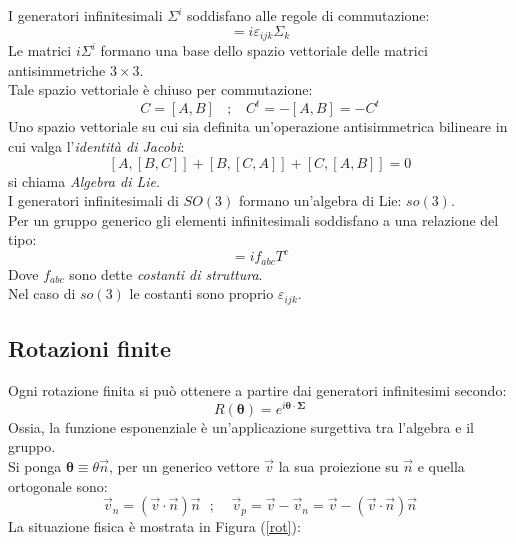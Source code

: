 \documentclass[twoside]{article}
\begin{document}
I generatori infinitesimali $\Sigma^i$ soddisfano alle regole di commutazione:
\begin{equation}
    [\Sigma_i,\Sigma_j]=i\varepsilon_{ijk}\Sigma_k
\end{equation}
Le matrici $i\Sigma^i$ formano una base dello spazio vettoriale delle matrici antisimmetriche $3\times 3$.
\\
Tale spazio vettoriale è chiuso per commutazione:
\begin{equation}
    C=[A,B] \ \ \ \ ; \ \ \ \ C^t=-[A,B]=-C^t
\end{equation}
Uno spazio vettoriale su cui sia definita un'operazione antisimmetrica bilineare in cui valga l'\textit{identità di Jacobi}:
\begin{equation} \label{Jacobi}
    [A,[B,C]]+[B,[C,A]]+[C,[A,B]]=0
\end{equation}
si chiama \textit{Algebra di Lie}.
\\
I generatori infinitesimali di $SO(3)$ formano un'algebra di Lie: $so(3)$.
\\
Per un gruppo generico gli elementi infinitesimali soddisfano a una relazione del tipo:
\begin{equation}
    [T^a,T^b]=if_{abc}T^c
\end{equation}
Dove $f_{abc}$ sono dette \textit{costanti di struttura}.
\\
Nel caso di $so(3)$ le costanti sono proprio $\varepsilon_{ijk}$.

\vspace{0.5cm}
\subsection{Rotazioni finite}
Ogni rotazione finita si può ottenere a partire dai generatori infinitesimi secondo:
\begin{equation} \label{10.2.1}
    R(\bm{\theta})=e^{i\bm{\theta}\cdot \bm{\Sigma}}
\end{equation}
Ossia, la funzione esponenziale è un'applicazione surgettiva tra l'algebra e il gruppo.
\\
Si ponga $\bm{\theta}\equiv \theta \Vec{n}$, per un generico vettore $\Vec{v}$ la sua proiezione su $\Vec{n}$ e quella ortogonale sono:
\begin{equation}
   \Vec{v}_n=(\Vec{v}\cdot \Vec{n})\Vec{n} \ \ \ ; \ \ \ \ \ \Vec{v}_p=\Vec{v}-\Vec{v}_n =\Vec{v}-(\Vec{v}\cdot \Vec{n})\Vec{n}
\end{equation}
La situazione fisica è mostrata in Figura (\ref{rot}):
\end{document}
